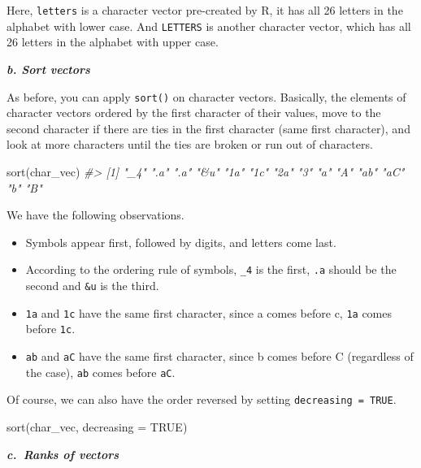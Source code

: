 \documentclass[
]{book}
\newenvironment{Shaded}{\begin{snugshade}}{\end{snugshade}}
\newcommand{\AttributeTok}[1]{\textcolor[rgb]{0.77,0.63,0.00}{#1}}
\newcommand{\CommentTok}[1]{\textcolor[rgb]{0.56,0.35,0.01}{\textit{#1}}}
\newcommand{\ConstantTok}[1]{\textcolor[rgb]{0.00,0.00,0.00}{#1}}
\newcommand{\FunctionTok}[1]{\textcolor[rgb]{0.00,0.00,0.00}{#1}}
\newcommand{\NormalTok}[1]{#1}
\providecommand{\tightlist}{%
  \setlength{\itemsep}{0pt}\setlength{\parskip}{0pt}}
\begin{document}
Here, \texttt{letters} is a character vector pre-created by R, it has all 26 letters in the alphabet with lower case. And \texttt{LETTERS} is another character vector, which has all 26 letters in the alphabet with upper case.

\textbf{\emph{b. Sort vectors}}

As before, you can apply \texttt{sort()} on character vectors. Basically, the elements of character vectors ordered by the first character of their values, move to the second character if there are ties in the first character (same first character), and look at more characters until the ties are broken or run out of characters.

\begin{Shaded}
\begin{Highlighting}[]
\FunctionTok{sort}\NormalTok{(char\_vec)}
\CommentTok{\#\textgreater{}  [1] "\_4" ".a" ".a" "\&u" "1a" "1c" "2a" "3"  "a"  "A"  "ab" "aC" "b"  "B"}
\end{Highlighting}
\end{Shaded}

We have the following observations.

\begin{itemize}
\tightlist
\item
  Symbols appear first, followed by digits, and letters come last.
\item
  According to the ordering rule of symbols, \texttt{\_4} is the first, \texttt{.a} should be the second and \texttt{\&u} is the third.
\item
  \texttt{1a} and \texttt{1c} have the same first character, since a comes before c, \texttt{1a} comes before \texttt{1c}.
\item
  \texttt{ab} and \texttt{aC} have the same first character, since b comes before C (regardless of the case), \texttt{ab} comes before \texttt{aC}.
\end{itemize}

Of course, we can also have the order reversed by setting \texttt{decreasing\ =\ TRUE}.

\begin{Shaded}
\begin{Highlighting}[]
\FunctionTok{sort}\NormalTok{(char\_vec, }\AttributeTok{decreasing =} \ConstantTok{TRUE}\NormalTok{)}
\end{Highlighting}
\end{Shaded}

\textbf{\emph{c.~Ranks of vectors}}
\end{document}
